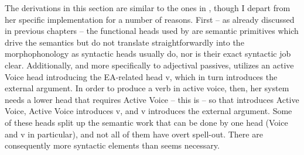 \begin{exe}
\begin{xlist}
\begin{exe}
\begin{xlist}
\begin{exe}
\begin{exe}
\begin{xlist}
\begin{exe}
\begin{exe}
\begin{xlist}
\begin{exe}
\begin{xlist}
\begin{exe}
\begin{xlist}
\begin{exe}
\begin{xlist}
\begin{exe}
\begin{xlist}
\begin{xlist}
\begin{exe}
\begin{xlist}
\begin{exe}
\begin{xlist}
\begin{exe}
\begin{exe}
\begin{exe}
\begin{xlist}
\begin{exe}
\begin{exe}
\begin{xlist}
\begin{exe}
\begin{xlist}
\begin{exe}
\begin{xlist}
\begin{exe}
\begin{xlist}
\begin{xlist}
\begin{exe}
\begin{xlist}
\begin{exe}
\begin{xlist}
\begin{exe}
\begin{xlist}
\begin{exe}
\begin{xlist}
\begin{exe}
\begin{exe}
\begin{exe}
\begin{exe}
\begin{exe}
\begin{xlist}
\begin{xlist}
The derivations in this section are similar to the ones in \cite{doron14adj}, though I depart from her specific implementation for a number of reasons. First -- as already discussed in previous chapters -- the functional heads used by \citeauthor{doron14adj} are semantic primitives which drive the semantics but do not translate straightforwardly into the morphophonology as syntactic heads usually do, nor is their exact syntactic job clear. Additionally, and more specifically to adjectival passives, \cite{doron14adj} utilizes an active Voice head introducing the EA-related head v, which in turn introduces the external argument. In order to produce a verb in active voice, then, her system needs a lower head that requires Active Voice -- this is  -- so that  introduces Active Voice, Active Voice introduces v, and v introduces the external argument. Some of these heads split up the semantic work that can be done by one head (Voice and v in particular), and not all of them have overt spell-out. There are consequently more syntactic elements than seems necessary. 



\end{xlist}
\end{xlist}
\end{exe}
\end{exe}
\end{exe}
\end{exe}
\end{exe}
\end{xlist}
\end{exe}
\end{xlist}
\end{exe}
\end{xlist}
\end{exe}
\end{xlist}
\end{exe}
\end{xlist}
\end{xlist}
\end{exe}
\end{xlist}
\end{exe}
\end{xlist}
\end{exe}
\end{xlist}
\end{exe}
\end{exe}
\end{xlist}
\end{exe}
\end{exe}
\end{exe}
\end{xlist}
\end{exe}
\end{xlist}
\end{exe}
\end{xlist}
\end{xlist}
\end{exe}
\end{xlist}
\end{exe}
\end{xlist}
\end{exe}
\end{xlist}
\end{exe}
\end{xlist}
\end{exe}
\end{exe}
\end{xlist}
\end{exe}
\end{exe}
\end{xlist}
\end{exe}
\end{xlist}
\end{exe}
